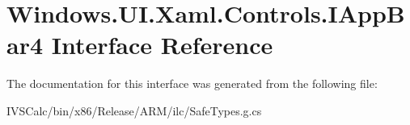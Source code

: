 \hypertarget{interface_windows_1_1_u_i_1_1_xaml_1_1_controls_1_1_i_app_bar4}{}\section{Windows.\+U\+I.\+Xaml.\+Controls.\+I\+App\+Bar4 Interface Reference}
\label{interface_windows_1_1_u_i_1_1_xaml_1_1_controls_1_1_i_app_bar4}


The documentation for this interface was generated from the following file\+:\begin{DoxyCompactItemize}
\item 
I\+V\+S\+Calc/bin/x86/\+Release/\+A\+R\+M/ilc/Safe\+Types.\+g.\+cs\end{DoxyCompactItemize}
